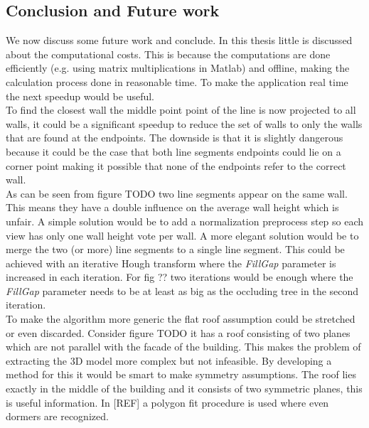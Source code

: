 \documentclass[10pt]{article}
\begin{document}

\subsection{Conclusion and Future work}
We now discuss some future work and conclude.  In this thesis little is discussed about the computational costs. This is because the computations are done efficiently (e.g. using matrix multiplications in Matlab) and offline, making the calculation process done in reasonable time. To make the application real time the next speedup would be useful.\\
To find the closest wall the middle point point of the line is now projected to all walls, it could be a significant speedup to reduce the set of walls to only the walls that are found at the endpoints. The downside is that it is slightly dangerous because it could be the case that both line segments endpoints could lie on a corner point making it possible that none of the endpoints refer to the correct wall.\\

As can be seen from figure TODO%
two line segments appear on the same wall. This means they have a double influence on the average wall height which is unfair. A simple solution would be to add a normalization preprocess step so each view has only one wall height vote per wall. A more elegant solution would be to merge the two (or more) line segments to a single line segment. This could be achieved with an iterative Hough transform where the \emph{FillGap} parameter is increased in each iteration. For fig ?? %
two iterations would be enough where the \emph{FillGap} parameter needs to be at least as big as the occluding tree in the second iteration.\\
To make the algorithm more generic the flat roof assumption could be stretched or even discarded.
Consider figure TODO %
it has a roof consisting of two planes which are not parallel with the facade of the building. This makes the problem of extracting the 3D model more complex but not 
infeasible. By developing a method for this it would be smart to make symmetry assumptions. The roof lies exactly in the middle of the building and it consists of two symmetric planes, this is useful information. In 
[REF] a polygon fit procedure is used where even dormers are recognized.\\
\end{document}
